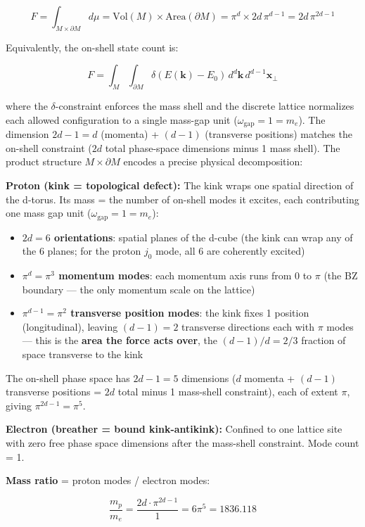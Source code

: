 \documentclass[
]{article}
\providecommand{\tightlist}{%
  \setlength{\itemsep}{0pt}\setlength{\parskip}{0pt}}
\begin{document}
\[F = \int_{M \times \partial M} d\mu = \text{Vol}(M) \times \text{Area}(\partial M) = \pi^d \times 2d\,\pi^{d-1} = 2d\,\pi^{2d-1}\]

Equivalently, the on-shell state count is:

\[F = \int_M \int_{\partial M} \delta(E(\mathbf{k}) - E_0)\, d^d\mathbf{k}\, d^{d-1}\mathbf{x}_\perp\]

where the \(\delta\)-constraint enforces the mass shell and the discrete
lattice normalizes each allowed configuration to a single mass-gap unit
(\(\omega_{\text{gap}} = 1 = m_e\)). The dimension \(2d-1 = d\)
(momenta) + \((d-1)\) (transverse positions) matches the on-shell
constraint (\(2d\) total phase-space dimensions minus 1 mass shell). The
product structure \(M \times \partial M\) encodes a precise physical
decomposition:

\textbf{Proton (kink = topological defect):} The kink wraps one spatial
direction of the d-torus. Its mass = the number of on-shell modes it
excites, each contributing one mass gap unit
(\(\omega_{\text{gap}} = 1 = m_e\)):

\begin{itemize}
\tightlist
\item
  \textbf{\(2d = 6\) orientations}: spatial planes of the d-cube (the
  kink can wrap any of the 6 planes; for the proton \(j_0\) mode, all 6
  are coherently excited)
\item
  \textbf{\(\pi^d = \pi^3\) momentum modes}: each momentum axis runs
  from 0 to \(\pi\) (the BZ boundary --- the only momentum scale on the
  lattice)
\item
  \textbf{\(\pi^{d-1} = \pi^2\) transverse position modes}: the kink
  fixes 1 position (longitudinal), leaving \((d-1) = 2\) transverse
  directions each with \(\pi\) modes --- this is the \textbf{area the
  force acts over}, the \((d-1)/d = 2/3\) fraction of space transverse
  to the kink
\end{itemize}

The on-shell phase space has \(2d-1 = 5\) dimensions (\(d\) momenta +
\((d-1)\) transverse positions = \(2d\) total minus 1 mass-shell
constraint), each of extent \(\pi\), giving \(\pi^{2d-1} = \pi^5\).

\textbf{Electron (breather = bound kink-antikink):} Confined to one
lattice site with zero free phase space dimensions after the mass-shell
constraint. Mode count = 1.

\textbf{Mass ratio} = proton modes / electron modes:

\[\frac{m_p}{m_e} = \frac{2d \cdot \pi^{2d-1}}{1} = 6\pi^5 = 1836.118\]
\end{document}

